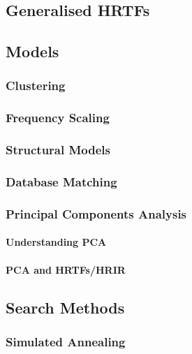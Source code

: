 \subsection{Generalised HRTFs}


\subsection{Models}

\subsubsection{Clustering}

\subsubsection{Frequency Scaling}

\subsubsection{Structural Models}

\subsubsection{Database Matching}

\subsubsection{Principal Components Analysis}

\paragraph{Understanding PCA}

\paragraph{PCA and HRTFs/HRIR}

\subsection{Search Methods}

\subsubsection{Simulated Annealing}